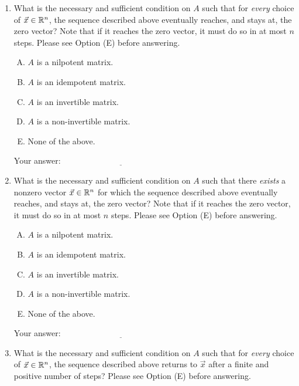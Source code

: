 \documentclass[10pt]{amsart}
\begin{document}
\begin{enumerate}
\item What is the necessary and sufficient condition on $A$ such that
  for {\em every} choice of $\vec{x} \in \mathbb{R}^n$, the sequence described
  above eventually reaches, and stays at, the zero vector? Note that
  if it reaches the zero vector, it must do so in at most $n$
  steps. Please see Option (E) before answering.

  \begin{enumerate}[(A)]
  \item $A$ is a nilpotent matrix.
  \item $A$ is an idempotent matrix.
  \item $A$ is an invertible matrix.
  \item $A$ is a non-invertible matrix.
  \item None of the above.
  \end{enumerate}

  \vspace{0.1in}
  Your answer: $\underline{\qquad\qquad\qquad\qquad\qquad\qquad\qquad}$
  \vspace{0.1in}

\item What is the necessary and sufficient condition on $A$ such that
  there {\em exists} a nonzero vector $\vec{x} \in \mathbb{R}^n$ for which the
  sequence described above eventually reaches, and stays at, the zero
  vector?  Note that if it reaches the zero vector, it must do so in
  at most $n$ steps. Please see Option (E) before answering.

  \begin{enumerate}[(A)]
  \item $A$ is a nilpotent matrix.
  \item $A$ is an idempotent matrix.
  \item $A$ is an invertible matrix.
  \item $A$ is a non-invertible matrix.
  \item None of the above.
  \end{enumerate}

  \vspace{0.1in}
  Your answer: $\underline{\qquad\qquad\qquad\qquad\qquad\qquad\qquad}$
  \vspace{0.1in}

\item What is the necessary and sufficient condition on $A$ such that
  for {\em every} choice of $\vec{x} \in \mathbb{R}^n$, the sequence described
  above returns to $\vec{x}$ after a finite and positive number of
  steps? Please see Option (E) before answering.


\end{enumerate}
\end{document}
